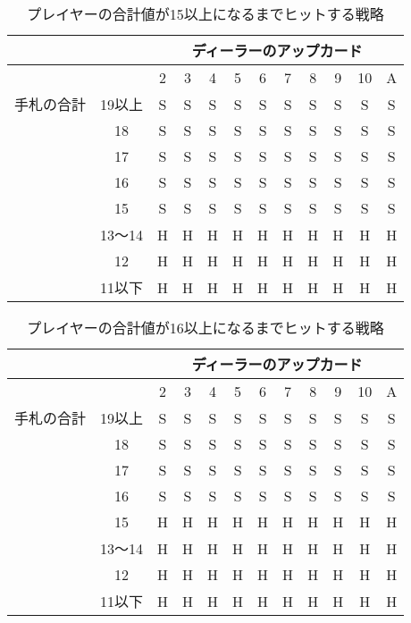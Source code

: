 \begin{table}[!hp]
  \centering
  \caption{プレイヤーの合計値が15以上になるまでヒットする戦略\label{hitleq15}}
  \begin{tabular}{|c|c|c|c|c|c|c|c|c|c|c|c|}
    \hline
    \multicolumn{2}{|c|}{} & \multicolumn{10}{|c|}{ディーラーのアップカード} \\ \hline
    \multicolumn{2}{|c|}{} & 2 & 3 & 4 & 5 & 6 & 7 & 8 & 9 & 10 & A \\ \hline
    手札の合計 & 19以上 & S & S & S & S & S & S & S & S & S & S \\ \cline{3-12}
              & 18 & S & S & S & S & S & S & S & S & S & S \\ \cline{3-12}
              & 17 & S & S & S & S & S & S & S & S & S & S \\ \cline{3-12}
              & 16 & S & S & S & S & S & S & S & S & S & S \\ \cline{3-12}
              & 15 & S & S & S & S & S & S & S & S & S & S \\ \cline{3-12}
              & 13～14 & H & H & H & H & H & H & H & H & H & H \\ \cline{3-12}
              & 12 & H & H & H & H & H & H & H & H & H & H \\ \cline{3-12}
              & 11以下 & H & H & H & H & H & H & H & H & H & H \\ \hline
  \end{tabular}
\end{table}

\begin{table}[p]
  \centering
  \caption{プレイヤーの合計値が16以上になるまでヒットする戦略\label{hitleq16}}
  \begin{tabular}{|c|c|c|c|c|c|c|c|c|c|c|c|}
    \hline
    \multicolumn{2}{|c|}{} & \multicolumn{10}{|c|}{ディーラーのアップカード} \\ \hline
    \multicolumn{2}{|c|}{} & 2 & 3 & 4 & 5 & 6 & 7 & 8 & 9 & 10 & A \\ \hline
    手札の合計 & 19以上 & S & S & S & S & S & S & S & S & S & S \\ \cline{3-12}
              & 18 & S & S & S & S & S & S & S & S & S & S \\ \cline{3-12}
              & 17 & S & S & S & S & S & S & S & S & S & S \\ \cline{3-12}
              & 16 & S & S & S & S & S & S & S & S & S & S \\ \cline{3-12}
              & 15 & H & H & H & H & H & H & H & H & H & H \\ \cline{3-12}
              & 13～14 & H & H & H & H & H & H & H & H & H & H \\ \cline{3-12}
              & 12 & H & H & H & H & H & H & H & H & H & H \\ \cline{3-12}
              & 11以下 & H & H & H & H & H & H & H & H & H & H \\ \hline
  \end{tabular}
\end{table}


